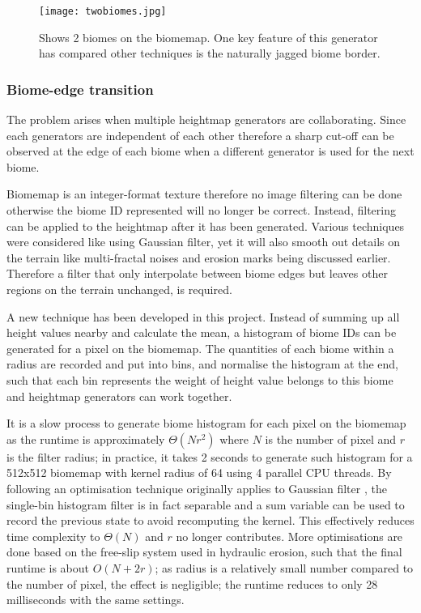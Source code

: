 \documentclass[oneside, a4paper]{article}
\begin{document}
    \begin{figure}[H]
        \texttt{[image: twobiomes.jpg]}
        \caption{Shows 2 biomes on the biomemap. One key feature of this generator has compared other techniques is the naturally jagged biome border.}
    \end{figure}

    \subsubsection{Biome-edge transition}

    The problem arises when multiple heightmap generators are collaborating. Since each generators are independent of each other therefore a sharp cut-off can be observed at the edge of each biome when a different generator is used for the next biome.

    Biomemap is an integer-format texture therefore no image filtering can be done otherwise the biome ID represented will no longer be correct. Instead, filtering can be applied to the heightmap after it has been generated. Various techniques were considered like using Gaussian filter, yet it will also smooth out details on the terrain like multi-fractal noises and erosion marks being discussed earlier. Therefore a filter that only interpolate between biome edges but leaves other regions on the terrain unchanged, is required.

    A new technique has been developed in this project. Instead of summing up all height values nearby and calculate the mean, a histogram of biome IDs can be generated for a pixel on the biomemap. The quantities of each biome within a radius are recorded and put into bins, and normalise the histogram at the end, such that each bin represents the weight of height value belongs to this biome and heightmap generators can work together.

    It is a slow process to generate biome histogram for each pixel on the biomemap as the runtime is approximately \(\Theta (Nr^{2})\) where \(N\) is the number of pixel and \(r\) is the filter radius; in practice, it takes 2 seconds to generate such histogram for a 512x512 biomemap with kernel radius of 64 using 4 parallel CPU threads. By following an optimisation technique originally applies to Gaussian filter \cite{fast_gaussian}, the single-bin histogram filter is in fact separable and a sum variable can be used to record the previous state to avoid recomputing the kernel. This effectively reduces time complexity to \(\Theta (N)\) and \(r\) no longer contributes. More optimisations are done based on the free-slip system used in hydraulic erosion, such that the final runtime is about \(O (N + 2r)\); as radius is a relatively small number compared to the number of pixel, the effect is negligible; the runtime reduces to only 28 milliseconds with the same settings.
\end{document}
